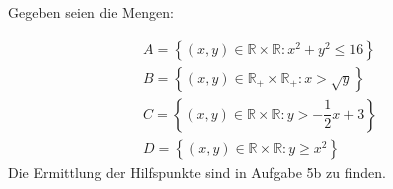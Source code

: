 Gegeben seien die Mengen: 

\begin{eqnarray}
	A = \left\{ \left(x,y \right) \in \mathbb{R} \times \mathbb{R}: x^2 +y^2 \le 16 \right\}\\
	B = \left\{ \left(x,y \right) \in \mathbb{R_{+}} \times \mathbb{R_{+}}: x > \sqrt{y} \right\}\\
	C = \left\{ \left(x,y \right) \in \mathbb{R} \times \mathbb{R}: y > -\dfrac{1}{2}x+3 \right\}\\
	D = \left\{ \left(x,y \right) \in \mathbb{R} \times \mathbb{R}: y \ge x^2 \right\}
\end{eqnarray}
Die Ermittlung der Hilfspunkte sind in Aufgabe 5b zu finden.
